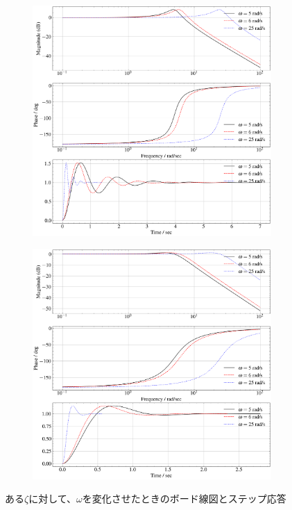 \begin{figure}
	\centering
	\begin{subfigure}{0.8\linewidth}
		\centering
		\includegraphics[width=0.8\linewidth]{src/figures/bode-phase-step-ideal-group-zeta/bode-phase-step-ideal-group-zeta-0.2.png}
		\label{fig:bode-phase-step-ideal-group-zeta-0.2}
	\end{subfigure}
	\begin{subfigure}{0.8\linewidth}
		\centering
		\includegraphics[width=0.8\linewidth]{src/figures/bode-phase-step-ideal-group-zeta/bode-phase-step-ideal-group-zeta-0.5.png}
		\label{fig:bode-phase-step-ideal-group-zeta-0.5}
	\end{subfigure}
	\caption{ある$\zeta$に対して、$\omega$を変化させたときのボード線図とステップ応答}\label{fig:bode-phase-step-ideal-group-zeta}
\end{figure}

